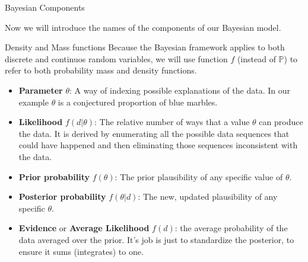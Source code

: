 \documentclass[handout]{beamer}
\begin{document}
\begin{frame}{Bayesian Components}
\scriptsize{
Now we will introduce the names of the components of our Bayesian model. \\


\begin{block}{Density and Mass functions}
Because the Bayesian framework applies to both discrete and continuos random variables, we will use function $f$ (instead of $\mathbb{P}$) to refer to both probability mass and density functions.
\end{block}

\begin{itemize}
\item \textbf{Parameter} $\theta$:  A way of indexing possible explanations of the data. In our example $\theta$ is a conjectured proportion of blue marbles. 

\item \textbf{Likelihood} $f(d|\theta)$: The relative number of ways that a value $\theta$ can produce the data. It is derived by enumerating all the possible data sequences that could have happened and then eliminating those sequences inconsistent with the data.
\item \textbf{Prior probability} $f(\theta)$: The prior plausibility of any specific value of $\theta$.
 
\item \textbf{Posterior probability} $f(\theta|d)$: The new, updated plausibility of any specific $\theta$. 

\item \textbf{Evidence} or \textbf{Average Likelihood} $f(d)$: the average probability of the data averaged over the prior. It’s job is just to standardize the posterior, to ensure it sums (integrates) to one. 
 
\end{itemize}
 } 

 
 
 
\end{frame}
\end{document}
